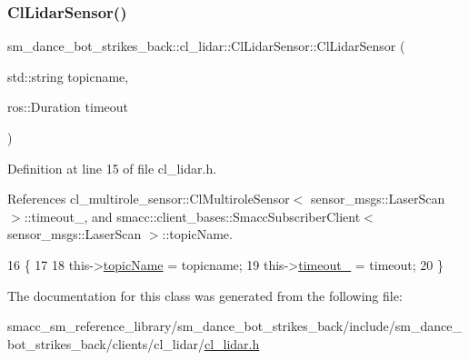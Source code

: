 \subsubsection{\texorpdfstring{Cl\+Lidar\+Sensor()}{ClLidarSensor()}}
{\footnotesize\ttfamily sm\+\_\+dance\+\_\+bot\+\_\+strikes\+\_\+back\+::cl\+\_\+lidar\+::\+Cl\+Lidar\+Sensor\+::\+Cl\+Lidar\+Sensor (\begin{DoxyParamCaption}\item[{std\+::string}]{topicname,  }\item[{ros\+::\+Duration}]{timeout }\end{DoxyParamCaption})\hspace{0.3cm}{\ttfamily [inline]}}



Definition at line 15 of file cl\+\_\+lidar.\+h.



References cl\+\_\+multirole\+\_\+sensor\+::\+Cl\+Multirole\+Sensor$<$ sensor\+\_\+msgs\+::\+Laser\+Scan $>$\+::timeout\+\_\+, and smacc\+::client\+\_\+bases\+::\+Smacc\+Subscriber\+Client$<$ sensor\+\_\+msgs\+::\+Laser\+Scan $>$\+::topic\+Name.


\begin{DoxyCode}
16     \{
17 
18         this->\hyperlink{classsmacc_1_1client__bases_1_1SmaccSubscriberClient_aeadf21a09412c6c9488e5acd50fb4f40}{topicName} = topicname;
19         this->\hyperlink{classcl__multirole__sensor_1_1ClMultiroleSensor_a25cddc88db7d6208258630c0e5982f1e}{timeout\_} = timeout;
20     \}
\end{DoxyCode}


The documentation for this class was generated from the following file\+:\begin{DoxyCompactItemize}
\item 
smacc\+\_\+sm\+\_\+reference\+\_\+library/sm\+\_\+dance\+\_\+bot\+\_\+strikes\+\_\+back/include/sm\+\_\+dance\+\_\+bot\+\_\+strikes\+\_\+back/clients/cl\+\_\+lidar/\hyperlink{sm__dance__bot__strikes__back_2include_2sm__dance__bot__strikes__back_2clients_2cl__lidar_2cl__lidar_8h}{cl\+\_\+lidar.\+h}\end{DoxyCompactItemize}
